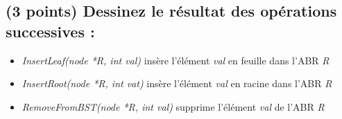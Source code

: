 \documentclass[11pt,a4paper]{article}
\begin{document}
\begin{table}[ht!]
\begin{minipage}{0.48\textwidth}
\begin{center}
  \hspace*{0.5cm}  
\end{center}

  \end{minipage}
\end{table}




\subsection{(3 points) Dessinez le résultat des opérations successives : }

\begin{itemize}
\item \textit{InsertLeaf(node *R, int val)} insère l'élément \og \textit{val} \fg{} en feuille dans l'ABR \og \textit{R} \fg{}
\item \textit{InsertRoot(node *R, int vat)} insère l'élément \og \textit{val} \fg{} en racine dans l'ABR \og \textit{R} \fg{}
\item \textit{RemoveFromBST(node *R, int val)} supprime l'élément \og \textit{val} \fg{} de l'ABR \og \textit{R} \fg{}
\end{itemize}

\vspace*{-0.5cm}
\end{document}
